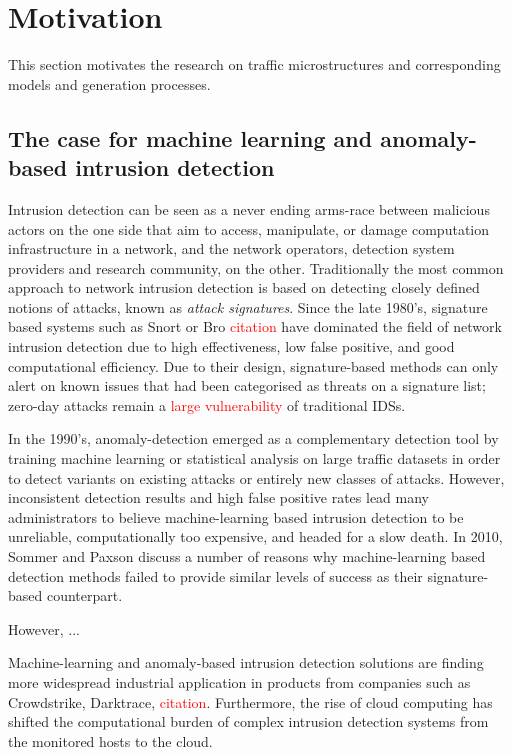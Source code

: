 \section{Motivation}

This section motivates the research on traffic microstructures and corresponding models and generation processes.

\subsection{The case for machine learning and anomaly-based intrusion detection}

Intrusion detection can be seen as a never ending arms-race between malicious actors on the one side that aim to access, manipulate, or damage computation infrastructure in a network, and the network operators, detection system providers and research community, on  the other. Traditionally the most common approach to network intrusion detection is based on detecting closely defined notions of attacks, known as \emph{attack signatures}. Since the late 1980's, signature based systems such as Snort or Bro \textcolor{red}{citation} have dominated the field of network intrusion detection due to high effectiveness, low false positive, and good computational efficiency. Due to their design, signature-based methods can only alert on known issues that had been categorised as threats on a signature list; zero-day attacks remain a \textcolor{red}{large vulnerability} of traditional IDSs.

In the 1990's, anomaly-detection emerged as a complementary detection tool by training machine learning or statistical analysis on large traffic datasets in order to detect variants on existing attacks or entirely new classes of attacks. However, inconsistent detection results and high false positive rates lead many administrators to believe machine-learning based intrusion detection to be unreliable, computationally too expensive, and headed for a slow death.
In 2010, Sommer and Paxson discuss a number of reasons why machine-learning based detection methods failed to provide similar levels of success as their signature-based counterpart.

However, ...

Machine-learning and anomaly-based intrusion detection solutions are finding more widespread industrial application in products from companies such as Crowdstrike, Darktrace, \textcolor{red}{citation}. Furthermore, the rise of cloud computing has shifted the computational burden of complex intrusion detection systems from the monitored hosts to the cloud.

